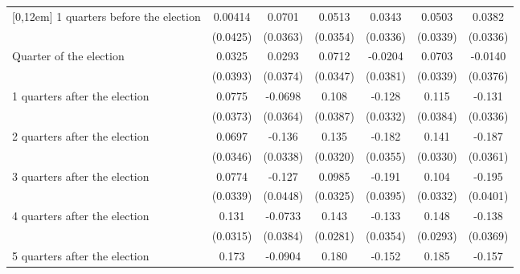 \begin{table}[!ht]
\begin{tabular}{l*{6}{c}}
[0,12em]
 1 quarters before the election&     0.00414         &      0.0701         &      0.0513         &      0.0343         &      0.0503         &      0.0382         \\
                    &    (0.0425)         &    (0.0363)         &    (0.0354)         &    (0.0336)         &    (0.0339)         &    (0.0336)         \\
[0,12em]
Quarter of the election&      0.0325         &      0.0293         &      0.0712\sym{*}  &     -0.0204         &      0.0703\sym{*}  &     -0.0140         \\
                    &    (0.0393)         &    (0.0374)         &    (0.0347)         &    (0.0381)         &    (0.0339)         &    (0.0376)         \\
[0,12em]
 1 quarters after the election&      0.0775\sym{*}  &     -0.0698         &       0.108\sym{**} &      -0.128\sym{***}&       0.115\sym{**} &      -0.131\sym{***}\\
                    &    (0.0373)         &    (0.0364)         &    (0.0387)         &    (0.0332)         &    (0.0384)         &    (0.0336)         \\
[0,12em]
 2 quarters after the election&      0.0697\sym{*}  &      -0.136\sym{***}&       0.135\sym{***}&      -0.182\sym{***}&       0.141\sym{***}&      -0.187\sym{***}\\
                    &    (0.0346)         &    (0.0338)         &    (0.0320)         &    (0.0355)         &    (0.0330)         &    (0.0361)         \\
[0,12em]
 3 quarters after the election&      0.0774\sym{*}  &      -0.127\sym{**} &      0.0985\sym{**} &      -0.191\sym{***}&       0.104\sym{**} &      -0.195\sym{***}\\
                    &    (0.0339)         &    (0.0448)         &    (0.0325)         &    (0.0395)         &    (0.0332)         &    (0.0401)         \\
[0,12em]
 4 quarters after the election&       0.131\sym{***}&     -0.0733         &       0.143\sym{***}&      -0.133\sym{***}&       0.148\sym{***}&      -0.138\sym{***}\\
                    &    (0.0315)         &    (0.0384)         &    (0.0281)         &    (0.0354)         &    (0.0293)         &    (0.0369)         \\
[0,12em]
 5 quarters after the election&       0.173\sym{***}&     -0.0904\sym{**} &       0.180\sym{***}&      -0.152\sym{***}&       0.185\sym{***}&      -0.157\sym{***}\\

\end{tabular}
\end{table}
